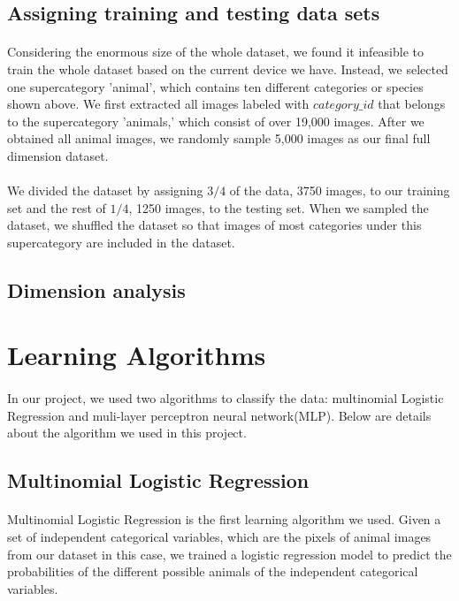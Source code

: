 \documentclass{article}
\begin{document}
\subsection{Assigning training and testing data sets}

\paragraph{}
Considering the enormous size of the whole dataset, we found it infeasible to train the whole dataset based on the current device we have. Instead, we selected one supercategory 'animal', which contains ten different categories or species shown above. We first extracted all images labeled with $category\_ id$ that belongs to the supercategory 'animals,' which consist of over 19,000 images. After we obtained all animal images, we randomly sample 5,000 images as our final full dimension dataset. 
\paragraph{}
We divided the dataset by assigning $3 \slash 4$ of the data, 3750 images, to our training set and the rest of $1\slash 4$, 1250 images, to the testing set. When we sampled the dataset, we shuffled the dataset so that images of most categories under this supercategory are included in the dataset.

\subsection{Dimension analysis}

\section{Learning Algorithms}
\paragraph{}
In our project, we used two algorithms to classify the data: multinomial Logistic Regression and muli-layer perceptron neural network(MLP). Below are details about the algorithm we used in this project. 
\subsection{Multinomial Logistic Regression}
\paragraph{}
Multinomial Logistic Regression is the first learning algorithm we used. Given a set of independent categorical variables, which are the pixels of animal images from our dataset in this case, we trained a logistic regression model to predict the probabilities of the different possible animals of the independent  categorical variables. 
\end{document}
